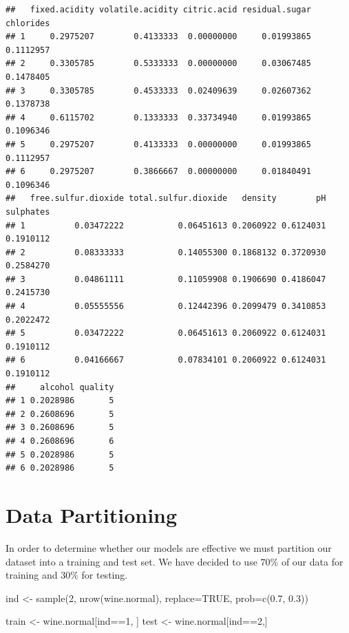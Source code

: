\documentclass[
]{book}
\newenvironment{Shaded}{\begin{snugshade}}{\end{snugshade}}
\newcommand{\AttributeTok}[1]{\textcolor[rgb]{0.77,0.63,0.00}{#1}}
\newcommand{\ConstantTok}[1]{\textcolor[rgb]{0.00,0.00,0.00}{#1}}
\newcommand{\DecValTok}[1]{\textcolor[rgb]{0.00,0.00,0.81}{#1}}
\newcommand{\FloatTok}[1]{\textcolor[rgb]{0.00,0.00,0.81}{#1}}
\newcommand{\FunctionTok}[1]{\textcolor[rgb]{0.00,0.00,0.00}{#1}}
\newcommand{\NormalTok}[1]{#1}
\newcommand{\OtherTok}[1]{\textcolor[rgb]{0.56,0.35,0.01}{#1}}
\newcommand{\SpecialCharTok}[1]{\textcolor[rgb]{0.00,0.00,0.00}{#1}}
\begin{document}
\begin{verbatim}
##   fixed.acidity volatile.acidity citric.acid residual.sugar chlorides
## 1     0.2975207        0.4133333  0.00000000     0.01993865 0.1112957
## 2     0.3305785        0.5333333  0.00000000     0.03067485 0.1478405
## 3     0.3305785        0.4533333  0.02409639     0.02607362 0.1378738
## 4     0.6115702        0.1333333  0.33734940     0.01993865 0.1096346
## 5     0.2975207        0.4133333  0.00000000     0.01993865 0.1112957
## 6     0.2975207        0.3866667  0.00000000     0.01840491 0.1096346
##   free.sulfur.dioxide total.sulfur.dioxide   density        pH sulphates
## 1          0.03472222           0.06451613 0.2060922 0.6124031 0.1910112
## 2          0.08333333           0.14055300 0.1868132 0.3720930 0.2584270
## 3          0.04861111           0.11059908 0.1906690 0.4186047 0.2415730
## 4          0.05555556           0.12442396 0.2099479 0.3410853 0.2022472
## 5          0.03472222           0.06451613 0.2060922 0.6124031 0.1910112
## 6          0.04166667           0.07834101 0.2060922 0.6124031 0.1910112
##     alcohol quality
## 1 0.2028986       5
## 2 0.2608696       5
## 3 0.2608696       5
## 4 0.2608696       6
## 5 0.2028986       5
## 6 0.2028986       5
\end{verbatim}

\hypertarget{data-partitioning}{%
\section{Data Partitioning}\label{data-partitioning}}

In order to determine whether our models are effective we must partition our dataset into a training and test set. We have decided to use \(70\%\) of our data for training and \(30\%\) for testing.

\begin{Shaded}
\begin{Highlighting}[]
\NormalTok{ind }\OtherTok{\textless{}{-}} \FunctionTok{sample}\NormalTok{(}\DecValTok{2}\NormalTok{, }\FunctionTok{nrow}\NormalTok{(wine.normal), }\AttributeTok{replace=}\ConstantTok{TRUE}\NormalTok{, }\AttributeTok{prob=}\FunctionTok{c}\NormalTok{(}\FloatTok{0.7}\NormalTok{, }\FloatTok{0.3}\NormalTok{))}

\NormalTok{train }\OtherTok{\textless{}{-}}\NormalTok{ wine.normal[ind}\SpecialCharTok{==}\DecValTok{1}\NormalTok{, ]}
\NormalTok{test }\OtherTok{\textless{}{-}}\NormalTok{ wine.normal[ind}\SpecialCharTok{==}\DecValTok{2}\NormalTok{,]}
\end{Highlighting}
\end{Shaded}
\end{document}
